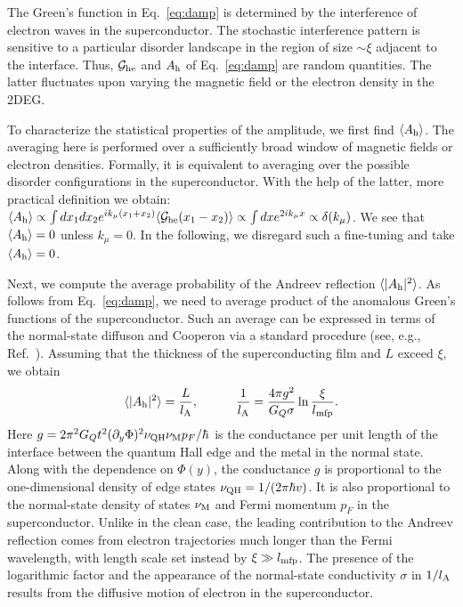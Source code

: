 \documentclass[reprint,
superscriptaddress,
amsmath,
amssymb,
aps,
prl,
floatfix,
english
]{revtex4-2}
\newcommand{\M}{{\rm M}}
\newcommand{\QH}{{\rm QH}}
\newcommand{\lprox}{L}
\newcommand{\pf}{p_F}
\newcommand{\lA}{l_{\rm A}}
\newcommand{\he}{A_{\rm h}}
\newcommand{\xic}{\xi}
\begin{document}
The Green's function in Eq.~\eqref{eq:damp} is determined by the interference of electron waves in the superconductor.
The stochastic interference pattern is sensitive to a particular disorder landscape in the region of size $\sim \xic$ adjacent to the interface. Thus, ${\cal G}_{\rm he}$ and $\he$ of Eq.~\eqref{eq:damp} are random quantities.
The latter fluctuates upon varying the magnetic field or the electron density in the 2DEG.

To characterize the statistical properties of the amplitude, we first find $\langle \he \rangle$.
The averaging here is performed over a sufficiently broad window of magnetic fields or electron densities.
Formally, it is equivalent to averaging over the possible disorder configurations in the superconductor.
With the help of the latter, more practical definition we obtain:
$\langle \he \rangle \propto \int dx_1 dx_2 e^{ik_\mu (x_1 +x_2)} \langle {\cal G}_{\rm he} (x_1 - x_2)\rangle \propto \int dx e^{2ik_\mu x} \propto \delta(k_\mu)$.
We see that $\langle \he \rangle = 0$ unless $k_\mu = 0$. In the following, we disregard such a fine-tuning and take $\langle \he \rangle = 0$.

Next, we compute the average probability of the Andreev reflection $\langle |\he|^2\rangle$.
As follows from Eq.~\eqref{eq:damp}, we need to average product of the anomalous Green's functions of the superconductor. 
Such an average can be expressed in terms of the normal-state diffuson and Cooperon via a standard procedure 
(see, e.g., Ref.~).
Assuming that the thickness of the superconducting film and $\lprox$ exceed $\xic$, we obtain~\cite{sm}
\begin{equation}\label{eq:var}
    \langle |\he|^2 \rangle = \frac{\lprox}{\lA},\quad\quad\quad \frac{1}{\lA} = \frac{4\pi g^2}{G_Q \sigma} \ln \frac{\xic}{l_{\rm mfp}}.
\end{equation}
Here $g = 2\pi^2 G_Q t^2 (\partial_y \Phi)^2   \nu_\QH  \nu_\M \pf / \hbar$ is the conductance per unit length of the interface between the quantum Hall edge and the metal in the normal state. Along with the dependence on $\Phi(y)$, the conductance $g$ is proportional to the one-dimensional density of edge states $\nu_{\rm QH} = 1/(2\pi \hbar v)$.
It is also proportional to the normal-state density of states $\nu_{\rm M}$ and Fermi momentum $p_F$ in the superconductor.
Unlike in the clean case, the leading contribution to the Andreev reflection comes from electron trajectories much longer than the Fermi wavelength, with length scale set instead by $\xic \gg l_{\rm mfp}$.
The presence of the logarithmic factor and the appearance of the normal-state conductivity $\sigma$ in $1/\lA$ results from the diffusive motion of electron in the superconductor.
\end{document}
